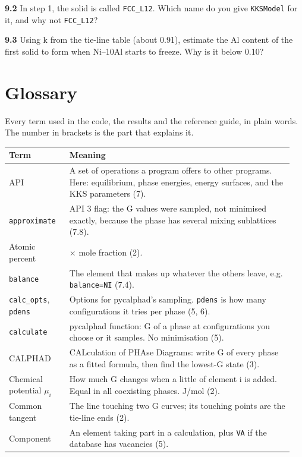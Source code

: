 \documentclass[12pt,a4paper]{article}
\begin{document}
\textbf{9.2} In step 1, the solid is called \texttt{FCC\_\allowbreak{}L12}. Which name do you give \texttt{KKSModel} for it, and why not \texttt{FCC\_\allowbreak{}L12}?

\textbf{9.3} Using k from the tie-line table (about 0.91), estimate the Al content of the first solid to form when Ni--10Al starts to freeze. Why is it below 0.10?


\section*{Glossary}
Every term used in the code, the results and the reference guide, in plain words. The number in brackets is the part that explains it.

\begingroup\small
\begin{longtable}{>{\raggedright\arraybackslash}p{0.202\linewidth}>{\raggedright\arraybackslash}p{0.745\linewidth}}
\toprule
\textbf{Term} & \textbf{Meaning} \\
\midrule
\endhead
API & A set of operations a program offers to other programs. Here: equilibrium, phase energies, energy surfaces, and the KKS parameters (7). \\
\texttt{approximate} & API 3 flag: the G values were sampled, not minimised exactly, because the phase has several mixing sublattices (7.8). \\
Atomic percent & 100 \(\times\) mole fraction (2). \\
\texttt{balance} & The element that makes up whatever the others leave, e.g. \texttt{balance=\textquotedbl{}NI\textquotedbl{}} (7.4). \\
\texttt{calc\_\allowbreak{}opts}, \texttt{pdens} & Options for pycalphad's sampling. \texttt{pdens} is how many configurations it tries per phase (5, 6). \\
\texttt{calculate} & pycalphad function: G of a phase at configurations you choose or it samples. No minimisation (5). \\
CALPHAD & CALculation of PHAse Diagrams: write G of every phase as a fitted formula, then find the lowest-G state (3). \\
Chemical potential \(\mu _{i}\) & How much G changes when a little of element i is added. Equal in all coexisting phases. J/mol (2). \\
Common tangent & The line touching two G curves; its touching points are the tie-line ends (2). \\
Component & An element taking part in a calculation, plus \texttt{VA} if the database has vacancies (5). \\

\end{longtable}
\end{document}

